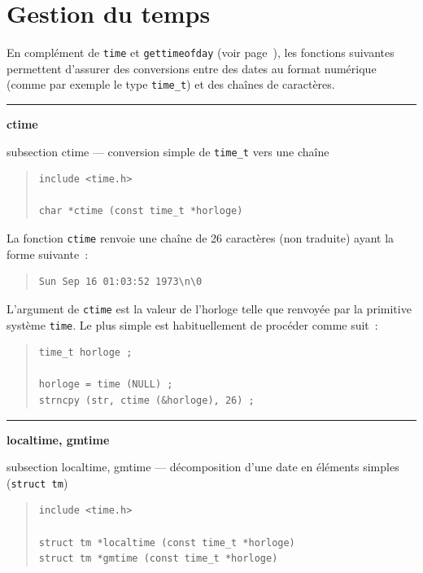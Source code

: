 \documentclass [twoside] {report}
\newcommand {\primitive} [1]
    {
	\phantomsection
	{\large \textbf {#1}}
	\addcontentsline {toc} {subsection} {#1}
    }
\newcommand {\separation}
    {
	\vspace {5mm}
	\nopagebreak
	\hrule
    }
\begin{document}


\section {Gestion du temps}
    \label {gestion-temps}

En complément de \texttt {time} et \texttt {gettimeofday} (voir
page~\pageref {time}), les fonctions suivantes permettent d'assurer des
conversions entre des dates au format numérique (comme par exemple le
type \texttt {time\_t}) et des chaînes de caractères.


\separation 
\primitive {ctime} --- conversion simple de \texttt {time\_t} vers une chaîne

\begin {quote}
\begin {verbatim}
include <time.h>

char *ctime (const time_t *horloge)
\end{verbatim}
\end {quote}

La fonction \texttt {ctime} renvoie une chaîne de 26 caractères
(non traduite) ayant la forme suivante~:
\begin {quote}
\begin {verbatim}
Sun Sep 16 01:03:52 1973\n\0
\end{verbatim}
\end {quote}
L'argument de \texttt {ctime} est la valeur de l'horloge telle
que renvoyée par la primitive système \texttt {time}. Le plus simple est
habituellement de procéder comme suit~:

\begin {quote}
\begin {verbatim}
time_t horloge ;

horloge = time (NULL) ;
strncpy (str, ctime (&horloge), 26) ;
\end{verbatim}
\end {quote}


\separation
\primitive {localtime, gmtime} --- décomposition d'une date en éléments simples (\texttt {struct tm})

\begin {quote}
\begin {verbatim}
include <time.h>

struct tm *localtime (const time_t *horloge)
struct tm *gmtime (const time_t *horloge)
\end{verbatim}
\end {quote}
\end{document}

